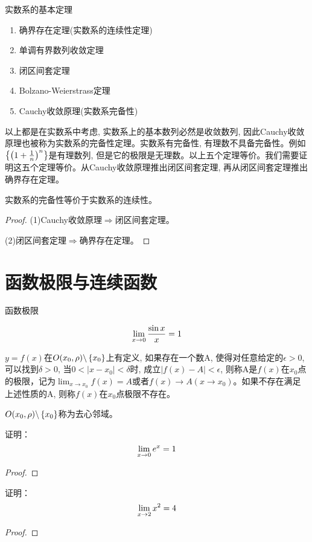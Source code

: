 \documentclass[lang=cn]{elegantbook}
\begin{document}
实数系的基本定理
\begin{enumerate}
    \item 确界存在定理(实数系的连续性定理)
    \item 单调有界数列收敛定理
    \item 闭区间套定理
    \item Bolzano-Weierstrass定理
    \item Cauchy收敛原理(实数系完备性)
\end{enumerate}
以上都是在实数系中考虑, 实数系上的基本数列必然是收敛数列, 因此Cauchy收敛原理也被称为实数系的完备性定理。实数系有完备性, 有理数不具备完备性。例如$\left\{ \left( 1 + \frac{1}{n}\right)^n\right\}$是有理数列, 但是它的极限是无理数。以上五个定理等价。我们需要证明这五个定理等价。从Cauchy收敛原理推出闭区间套定理, 再从闭区间套定理推出确界存在定理。
\begin{theorem}
    实数系的完备性等价于实数系的连续性。
\end{theorem}
\begin{proof}
    (1)Cauchy收敛原理$\Rightarrow$闭区间套定理。

    (2)闭区间套定理$\Rightarrow$确界存在定理。
\end{proof}

\chapter{函数极限与连续函数}
函数极限

\[ \lim_{x \to 0 } \frac{\sin x}{x} = 1 \]
\begin{definition}
    $y = f(x)$在$O(x_0, \rho) \backslash \left\{ x_0\right\}$上有定义, 如果存在一个数A, 使得对任意给定的$\epsilon > 0$, 可以找到$\delta > 0$, 当$0 < \left| x - x_0 \right| < \delta$时, 成立$\left| f(x) - A\right| < \epsilon$, 则称A是$f(x)$在$x_0$点的极限，记为$\lim_{x \to x_0} f(x) = A$或者$f(x) \to A (x \to x_0)$。如果不存在满足上述性质的A, 则称$f(x)$在$x_0$点极限不存在。
\end{definition}
$O(x_0, \rho) \backslash \left\{ x_0\right\}$称为去心邻域。

\begin{proposition}
    证明：
    \[ \lim_{x \to 0 } e^x = 1\]
\end{proposition}
\begin{proof}

\end{proof}

\begin{proposition}
    证明：
    \[ \lim_{x \to 2 } x^2 = 4 \]
\end{proposition}
\begin{proof}

\end{proof}
\end{document}
